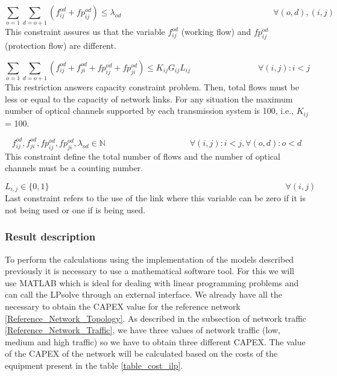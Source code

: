 \begin{equation}
\sum_{o=1} \sum_{d=o+1} \left(f_{ij}^{od}  + fp_{ij}^{od}\right) \leq \lambda_{od}  \qquad \qquad \qquad \qquad \qquad \qquad \qquad \qquad \qquad
\forall (o,d), (i,j)
\label{ILPTransp4p}
\end{equation}
\noindent
This constraint assures us that the variable $f_{ij}^{od}$ (working flow) and $fp_{ij}^{od}$ (protection flow) are different.

\begin{equation}
\sum_{o=1} \sum_{d=o+1} \left(f_{ij}^{od} + f_{ji}^{od} + fp_{ij}^{od} + fp_{ji}^{od}\right) \leq K_{ij} G_{ij} L_{ij} \qquad \qquad \qquad \qquad
\forall(i,j) : i < j
\label{ILPTransp4}
\end{equation}
\noindent
This restriction answers capacity constraint problem. Then, total flows must be less or equal to the capacity of network links. For any situation the maximum number of optical channels supported by each transmission system is 100, i.e., $K_{ij}$ = 100.

\begin{equation}
f_{ij}^{od} , f_{ji}^{od} , fp_{ij}^{od} , fp_{ji}^{od} , \lambda_{od} \in \mathbb{N}   \qquad \qquad \qquad \qquad \qquad
\forall(i,j) : i < j, \forall(o,d) : o < d
\label{ILPTransp5}
\end{equation}
\noindent
This constraint define the total number of flows and the number of optical channels must be a counting number.

\begin{equation}
L_{i,j} \in \{0,1\} \qquad \qquad \qquad \qquad \qquad \qquad \qquad \qquad \qquad \qquad \qquad \qquad \qquad \qquad
\forall(i,j)
\label{ILPTranspL1}
\end{equation}
\noindent
Last constraint refers to the use of the link where this variable can be zero if it is not being used or one if is being used.\\


\subsubsection{Result description}

To perform the calculations using the implementation of the models described previously it is necessary to use a mathematical software tool. For this we will use MATLAB which is ideal for dealing with linear programming problems and can call the LPsolve through an external interface. We already have all the necessary to obtain the CAPEX value for the reference network \ref{Reference_Network_Topology}. As described in the subsection of network traffic \ref{Reference_Network_Traffic}, we have three values of network traffic (low, medium and high traffic) so we have to obtain three different CAPEX. The value of the CAPEX of the network will be calculated based on the costs of the equipment present in the table \ref{table_cost_ilp}.\\

